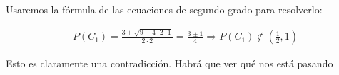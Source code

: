 \documentclass[a4paper]{article}
\begin{document}
\begin{enumerate}
{    Usaremos la fórmula de las ecuaciones de segundo grado para resolverlo:

    \begin{eqnarray*}
      P(C_1) = \frac{3 \pm \sqrt{9 - 4 \cdot 2 \cdot 1}}{2 \cdot 2} = \frac{3 \pm 1}{4}
      \Rightarrow P(C_1) \notin (\frac{1}{2} , 1)
    \end{eqnarray*}

    Esto es claramente una contradicción. Habrá que ver qué nos está pasando





    }
  \end{enumerate}
\end{document}
